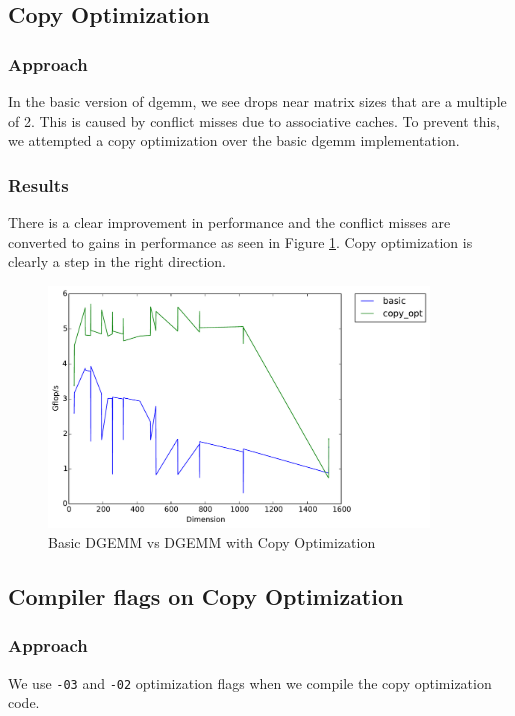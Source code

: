 \documentclass[11pt]{article}
\theoremstyle{plain}
\theoremstyle{definition}
\begin{document}
\subsection{Copy Optimization}
\subsubsection{Approach}
In the basic version of dgemm, we see drops near matrix sizes that are a multiple of 2. This is caused by conflict misses due to associative caches. To prevent this, we attempted a copy optimization over the basic dgemm implementation.
\subsubsection{Results}
There is a clear improvement in performance and the conflict misses are converted to gains in performance as seen in Figure \ref{basic_copy_opt}. Copy optimization is clearly a step in the right direction.
\begin{figure}[H]
    \includegraphics[width=0.9\textwidth]{timing_basic_vs_copy_opt.pdf}
    \caption{Basic DGEMM vs DGEMM with Copy Optimization}
    \label{basic_copy_opt}
\end{figure} 
\subsection{Compiler flags on Copy Optimization}
\subsubsection{Approach}
We use \texttt{-03} and \texttt{-02} optimization flags when we compile the copy optimization code.
\end{document}
